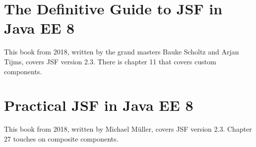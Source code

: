 \section*{The Definitive Guide to JSF in Java EE 8}
This book \cite{Scholtz2018TheDG} from 2018, written by the grand masters Bauke Scholtz and Arjan Tijms, covers JSF version 2.3.
There is chapter 11 that covers custom components.


\section*{Practical JSF in Java EE 8}
This book \cite{muller2018practicalJSF} from 2018, written by Michael Müller, covers JSF version 2.3.
Chapter 27 touches on composite components.



